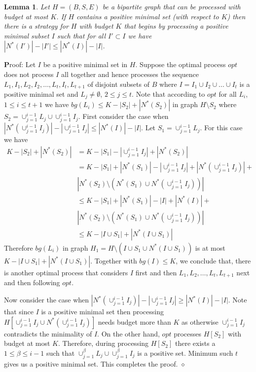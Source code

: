 \documentclass[letterpaper,11pt,abstracton]{scrartcl}
\newcommand{\qed}{\hfill$\diamond$}
\newcommand{\pf}{{\textbf Proof: }}
\newtheorem{lemma}[theorem]{Lemma}
\begin{document}
\begin{lemma} \label{lm:minpos}
  Let $H=(B,S,E)$ be a bipartite graph that can be processed with budget at most $K$.
If $H$ contains a positive minimal set (with respect to $K$) then there is a strategy for $H$ with budget $ K$ 
  that begins by processing a positive minimal
  subset $I$ such that for all $I'\subset I$ we have $|N^*(I')|-|I'|\leq |N^*(I)|-|I|$.
\end{lemma}
\pf Let $I$ be a positive minimal set in $H$. Suppose the optimal process $opt$ does not process $I$ all together and hence processes the sequence
$L_1,I_1,L_2,I_2,\dots, L_t,I_t,L_{t+1}$ of disjoint subsets of $B$ where
$I= I_1 \cup I_2 \cup ... \cup I_t$  is a positive minimal set and $L_j \ne \emptyset$, $2 \le j \le t$. Note that according to $opt$
for all $L_i$, $1 \le i \le t+1$ we have $bg(L_i) \le K-|S_2|+|N^*(S_2)|$ in graph $H\setminus S_2$ 
where $S_2= \cup_{j=1}^{i-1}L_j \cup  \cup_{j=1}^{i-1} I_j$.
First consider the case when $|N^*(\cup_{j=1}^{i-1} I_j)|-|\cup_{j=1}^{i-1} I_j|\leq |N^*(I)|-|I|$. 
Let $S_1=\cup_{j=1}^{i-1} L_j$. 
For this case we have
\begin{align}\nonumber
K-|S_2|+|N^*(S_2)|&= K- |S_1|-|\cup_{j=1}^{i-1}I_j|+|N^*(S_2)|\\ \nonumber
				  &=K-|S_1|+|N^*(S_1)|-|\cup_{j=1}^{i-1}I_j|+|N^*   					(\cup_{j=1}^{i-1}I_j)|+ \\ \nonumber
                  &|N^*(S_2)\setminus (N^*(S_1)\cup N^*(\cup_{j=1}^{i-1}I_j))|\\ \nonumber
				  & \leq  K-|S_1|+|N^*(S_1)|-|I|+|N^*(I)|+ \\ \nonumber
                  &|N^*(S_2)\setminus (N^*(S_1)\cup N^*(\cup_{j=1}^{i-1}I_j))|\\ \nonumber
                  & \leq  K-|I\cup S_1|+|N^*(I\cup S_1)|
\end{align}
Therefore $bg(L_i)$ in graph $H_1= H \setminus (I \cup S_1  \cup  N^*(I \cup S_1))$ is at most $K- |I \cup S_1|+|N^*(I \cup S_1)|$.
Together with $bg(I) \le K$, we conclude that, there is another optimal process that considers $I$ 
first and then $L_1,L_2,\dots, L_t,L_{t+1}$ next and then following $opt$. 

Now consider the case when $|N^*(\cup_{j=1}^{i-1} I_j)|-|\cup_{j=1}^{i-1} I_j|\geq |N^*(I)|-|I|$. 
Note that since $I$ is a positive minimal set then processing $H[\cup_{j=1}^{i-1} I_j\cup N^*(\cup_{j=1}^{i-1} I_j)]$ 
needs budget more than $K$ as otherwise $\cup_{j=1}^{i-1} I_j$ contradicts the minimality of $I$. On the other hand, $opt$ processes $H[S_2]$ 
with budget at most $K$. Therefore, during processing $H[S_2]$ there exists a $1\leq \beta\leq i-1$ such 
that $\cup_{j=1}^{\beta} L_j \cup \cup_{j=1}^{\beta} I_j$ is a positive set. Minimum such $t$ gives us a positive minimal set.
This completes the proof.
\qed 
\end{document}
